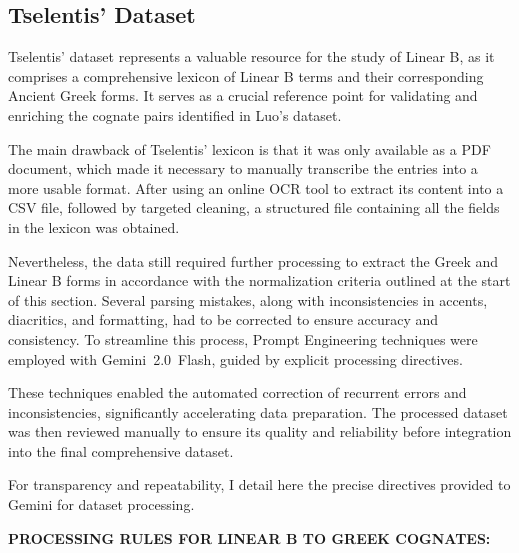 \subsection{Tselentis' Dataset}
Tselentis' dataset represents a valuable resource for the study of Linear B, as it comprises a comprehensive lexicon of Linear B terms and their corresponding Ancient Greek forms.  
It serves as a crucial reference point for validating and enriching the cognate pairs identified in Luo's dataset.  

The main drawback of Tselentis' lexicon is that it was only available as a PDF document, which made it necessary to manually transcribe the entries into a more usable format.
After using an online OCR tool to extract its content into a CSV file, followed by targeted cleaning, a structured file containing all the fields in the lexicon was obtained.

Nevertheless, the data still required further processing to extract the Greek and Linear B forms in accordance with the normalization criteria outlined at the start of this section.
Several parsing mistakes, along with inconsistencies in accents, diacritics, and formatting, had to be corrected to ensure accuracy and consistency.
To streamline this process, Prompt Engineering techniques were employed with Gemini~2.0~Flash, guided by explicit processing directives.

These techniques enabled the automated correction of recurrent errors and inconsistencies, significantly accelerating data preparation.
The processed dataset was then reviewed manually to ensure its quality and reliability before integration into the final comprehensive dataset.

For transparency and repeatability, I detail here the precise directives provided to Gemini for dataset processing.

\bigskip
\noindent\textbf{PROCESSING RULES FOR LINEAR B TO GREEK COGNATES:}

